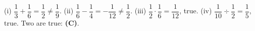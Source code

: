 (i) $\dfrac13+\dfrac16=\dfrac12\ne\dfrac19$. (ii) $\dfrac16-\dfrac14=-\dfrac1{12}\ne\dfrac12$. (iii) $\dfrac12\cdot\dfrac16=\dfrac1{12}$, true. (iv) $\dfrac1{10}\div\dfrac12=\dfrac15$, true. Two are true: \textbf{(C)}.
